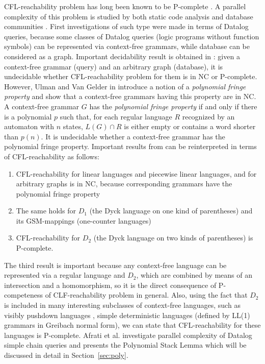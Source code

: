 \documentclass[smallextended]{svjour3}       %
\begin{document}
CFL-reachability problem has long been known to be P-complete \cite{PCompl}. A parallel complexity of this problem is studied by both static code analysis \cite*{RepSeq, RepsBasic} and database communities \cite*{ChainQ, Ullman, Yannakakis}. First investigations of such type were made in terms of Datalog queries, because some classes of Datalog queries (logic programs
without function symbols) can be represented via context-free grammars, while database can be considered as a graph. Important decidability result is obtained in \cite{Vardi}: given a context-free grammar (query) and an arbitrary graph (database), it is undecidable whether CFL-reachability problem for them is in NC or P-complete. However, Ulman and Van Gelder in \cite{Ullman} introduce a notion of a  \textit{polynomial fringe property} and show that a context-free grammars having this property are in NC. A context-free grammar $G$ has the \textit{polynomial fringe property} if and only if there is a polynomial $p$ such that, for each regular language $R$ recognized by an automaton with $n$ states, $L(G) \cap R$ is either empty or contains a word shorter than $p(n)$. It is undecidable whether a context-free grammar has the polynomial fringe property. Important results from \cite{Ullman} can be reinterpreted in terms of CFL-reachability as follows: 
\begin{enumerate}
\item CFL-reachability for linear languages and piecewise linear languages, and for arbitrary graphs is in NC, because corresponding grammars have the polynomial fringe property
\item The same holds for $D_1$ (the Dyck language on one kind of parentheses) and its GSM-mappings (one-counter languages)
\item CFL-reachability for $D_2$ (the Dyck language on two kinds of parentheses) is P-complete.
\end{enumerate}
The third result is important because any context-free language can be represented via a regular language and $D_2$, which are combined by means of an intersection and a homomorphism, so it is the direct consequence of P-competeness of CLF-reachability problem in general. Also, using the fact that $D_2$ is included in many interesting subclasses of context-free languages, such as visibly pushdown languages \cite{Okhotin2014ComplexityOI}, simple deterministic languages (defined by LL(1) grammars in Greibach normal form), we can state that CFL-reachability for these languages is P-complete. Afrati et al. \cite{ChainQ} investigate parallel complexity of Datalog simple chain queries and presents the Polynomial Stack Lemma which will be discussed in detail in Section~\ref{sec:poly}. 
\end{document}
